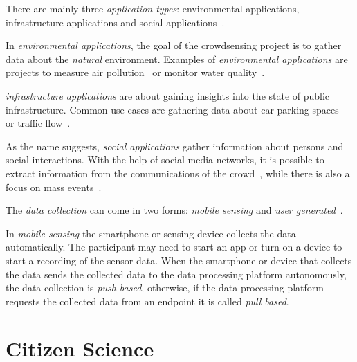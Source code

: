 There are mainly three \textit{application types}: environmental applications, infrastructure applications and social applications~\cite{ganti2011mobile}.

In \textit{environmental applications}, the goal of the crowdsensing project is to gather data about the \textit{natural} environment.
Examples of \textit{environmental applications} are projects to measure air pollution~\cite{hasenfratz2012participatory,sivaraman2013hazewatch,liu2018third} or monitor water quality~\cite{minkman2015citizen,rapousis2016performance,shang2023crowdwatersens}.

\textit{infrastructure applications} are about gaining insights into the state of public infrastructure.
Common use cases are gathering data about car parking spaces~\cite{villanueva2015crowdsensing,coric2013crowdsensing,rinne2014mobile} or traffic flow~\cite{wang2018city,li2019privacy,mei2020towards}.

As the name suggests, \textit{social applications} gather information about persons and social interactions.
With the help of social media networks, it is possible to extract information from the communications of the crowd~\cite{grasso2017public,cecilia2020mobile,phan2019drinks}, while there is also a focus on mass events~\cite{rahman2017location,cardone2014crowdsensing,jarvis2013ubicomp}.

The \textit{data collection} can come in two forms: \textit{mobile sensing} and \textit{user generated}~\cite{pietschmann2008croco}.

In \textit{mobile sensing} the smartphone or sensing device collects the data automatically.
The participant may need to start an app or turn on a device to start a recording of the sensor data.
When the smartphone or device that collects the data sends the collected data to the data processing platform autonomously, the data collection is \textit{push based}, otherwise, if the data processing platform requests the collected data from an endpoint it is called \textit{pull based}. 

\section{Citizen Science}
\label{sec:citizen_science_background}